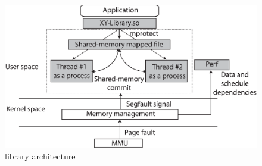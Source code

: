 
\begin{figure}[t]

\centering
      \includegraphics[scale=.35]{figure/Library-architecture}
  \caption{\projecttitle library architecture}
   
  \label{fig:lib-architecture}

\end{figure}
